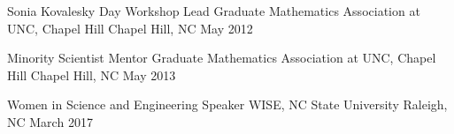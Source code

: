 


\begin{cventries}

  \cventry
    {Sonia Kovalesky Day Workshop Lead} %
    {Graduate Mathematics Association at UNC, Chapel Hill} %
    {Chapel Hill, NC} %
    {May 2012} %
    {
    }

  \cventry
    {Minority Scientist Mentor} %
    {Graduate Mathematics Association at UNC, Chapel Hill} %
    {Chapel Hill, NC} %
    {May 2013} %
    {
    }

  \cventry
    {Women in Science and Engineering Speaker} %
    {WISE, NC State University} %
    {Raleigh, NC} %
    {March 2017} %
    {
    }


    
\end{cventries}
